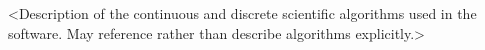 

<Description of the continuous and discrete scientific algorithms used
in the software.  May reference rather than describe algorithms explicitly.>
